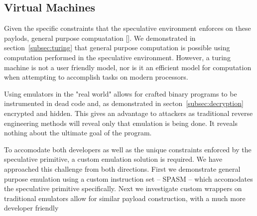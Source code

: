 % 
% 

\subsection{Virtual Machines}
Given the specific constraints that the speculative environment enforces on these 
paylods, general purpose compuatation []. We demonstrated in section~\ref{subsec:turing} that 
general purpose computation is possible using computation performed in the 
speculative environment. However, a turing machine is not a user friendly model,
nor is it an efficient model for computation when attempting to accomplish tasks
on modern processors. 

Using emulators in the "real world" allows for crafted binary programs to be 
instrumented in dead code and, as demonstrated in secton~\ref{subsec:decryption} 
encrypted and hidden. This gives an advantage to attackers as traditional 
reverse engineering methods will reveal only that emulation is being done. 
It reveals nothing about the ultimate goal of the program. 

To accomodate both developers as well as the unique constraints 
enforced by the speculative primitive, a custom emulation solution is required. We 
have approached this challenge from both directions. First we demonstrate 
general purpose emulation using a custom instruction set -- SPASM -- which
accomodates the speculative primitive specifically. Next we investigate custom 
wrappers on traditional emulators allow for similar payload construction,
with a much more developer friendly 

%   

